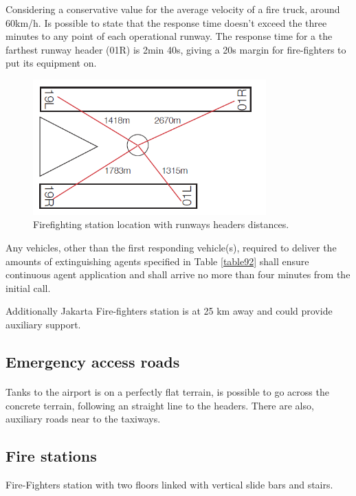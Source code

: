 		Considering a conservative value for the average velocity of a fire truck, around 60km/h. Is possible to state that the response time doesn't exceed the three minutes to any point of each operational runway. The response time for a the farthest runway header (01R) is 2min 40s, giving a 20s margin for fire-fighters to put its equipment on. 
		\begin{figure}[H]
			\centering
			\includegraphics[clip, trim=0cm 0cm 0cm 0cm, width=0.8\textwidth]{./images/firefighting/schemeFire}
			\caption{Firefighting station location with runways headers distances.}
			\label{schemeFire}
		\end{figure}
		
		Any vehicles, other than the first responding vehicle(s), required to deliver the amounts of extinguishing agents specified in Table \ref{table92} shall ensure continuous agent application and shall arrive no more than four minutes from the initial call.
		
		Additionally Jakarta Fire-fighters station is at 25 km away and could provide auxiliary support.
		
		\subsection{Emergency access roads}
		\paragraph{} Tanks to the airport is on a perfectly flat terrain, is possible to go across the concrete terrain, following an straight line to the headers. There are also, auxiliary roads near to the taxiways.
		
		\subsection{Fire stations}
		Fire-Fighters station with two floors linked with vertical slide bars and stairs. 
		
